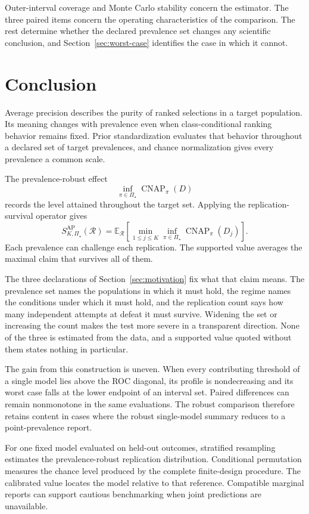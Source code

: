 \documentclass[11pt]{article}
\newcommand{\CNAP}{\operatorname{CNAP}}
\newcommand{\Regime}{\mathcal{R}}
\newcommand{\PSet}{\Pi_\star}
\newcommand{\E}{\mathbb{E}}
\theoremstyle{remark}
\begin{document}
Outer-interval coverage and Monte Carlo stability concern the estimator. The three paired items concern the operating characteristics of the comparison. The rest determine whether the declared prevalence set changes any scientific conclusion, and Section~\ref{sec:worst-case} identifies the case in which it cannot.

\section{Conclusion}

Average precision describes the purity of ranked selections in a target population. Its meaning changes with prevalence even when class-conditional ranking behavior remains fixed. Prior standardization evaluates that behavior throughout a declared set of target prevalences, and chance normalization gives every prevalence a common scale.

The prevalence-robust effect
\[
\inf_{\pi\in\PSet}\CNAP_\pi(D)
\]
records the level attained throughout the target set. Applying the replication-survival operator gives
\[
S_{K,\PSet}^{\mathrm{AP}}(\Regime)
=
\E_{\Regime}
\left[
\min_{1\leq j\leq K}
\inf_{\pi\in\PSet}
\CNAP_\pi(D_j)
\right].
\]
Each prevalence can challenge each replication. The supported value averages the maximal claim that survives all of them.

The three declarations of Section~\ref{sec:motivation} fix what that claim means. The prevalence set names the populations in which it must hold, the regime names the conditions under which it must hold, and the replication count says how many independent attempts at defeat it must survive. Widening the set or increasing the count makes the test more severe in a transparent direction. None of the three is estimated from the data, and a supported value quoted without them states nothing in particular.

The gain from this construction is uneven. When every contributing threshold of a single model lies above the ROC diagonal, its profile is nondecreasing and its worst case falls at the lower endpoint of an interval set. Paired differences can remain nonmonotone in the same evaluations. The robust comparison therefore retains content in cases where the robust single-model summary reduces to a point-prevalence report.

For one fixed model evaluated on held-out outcomes, stratified resampling estimates the prevalence-robust replication distribution. Conditional permutation measures the chance level produced by the complete finite-design procedure. The calibrated value locates the model relative to that reference. Compatible marginal reports can support cautious benchmarking when joint predictions are unavailable.
\end{document}
